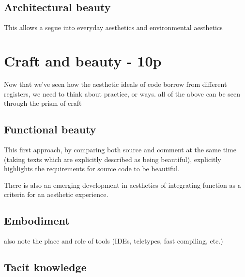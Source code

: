 \subsection{Architectural beauty}

This allows a segue into everyday aesthetics and environmental aesthetics

\section{Craft and beauty - 10p}

Now that we've seen how the aesthetic ideals of code borrow from different registers, we need to think about practice, or ways. all of the above can be seen through the prism of craft

\subsection{Functional beauty}

This first approach, by comparing both source and comment at the same time (taking texts which are explicitly described as being beautiful), explicitly highlights the requirements for source code to be beautiful. 

There is also an emerging development in aesthetics of integrating function as a criteria for an aesthetic experience.

\subsection{Embodiment}

also note the place and role of tools (IDEs, teletypes, fast compiling, etc.)

\subsection{Tacit knowledge}

